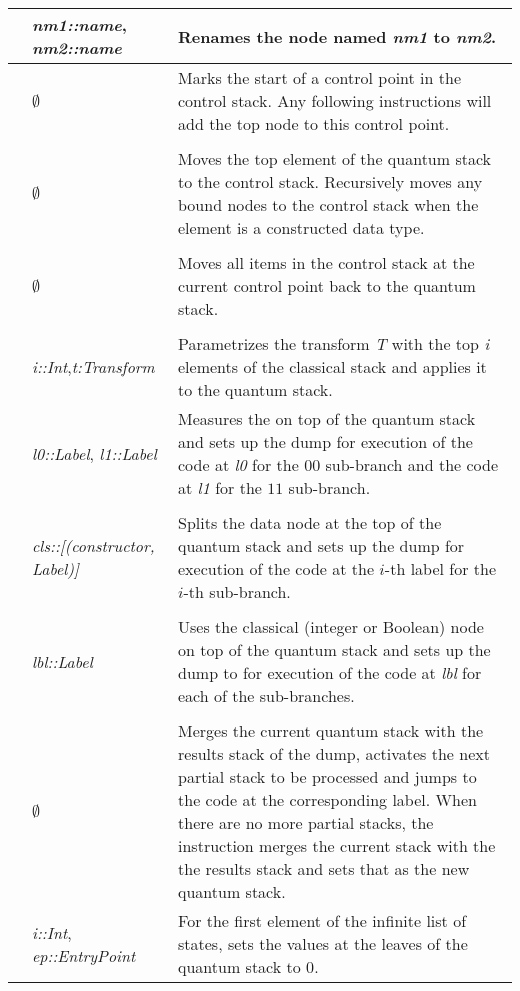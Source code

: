 {\begin{singlespace}
\begin{supertabular}{|p{.85in}|p{1.2in}|p{3.69in}|}
&\emph{nm1::name}, \emph{nm2::name}&Renames 
the node named \emph{nm1} to 
\emph{nm2}.\\
\hline
{}&$\emptyset$&Marks  the start
of a control point in the control stack. Any following  
instructions will add the top node to this control point.\\ & & \\
&$\emptyset$&Moves the top element of the quantum stack
to the control stack. Recursively moves any bound nodes to the control
stack when the element is 
a constructed data type.\\ & & \\
&$\emptyset$&Moves all items in the  control stack at the
current control point back to the quantum stack.\\ & & \\
&\emph{i::Int},\emph{t:Transform}&Parametrizes the transform \emph{T} with
the top \emph{i} elements of the classical stack and applies it to the
 quantum stack.\\
\hline
{}&\emph{l0::Label}, \emph{l1::Label}&Measures 
the \qubit{} on top of the
quantum stack and sets up the dump for execution of
 the code at \emph{l0} for the $00$ sub-branch and 
the code at \emph{l1} for the $11$ sub-branch.\\ & & \\
&\emph{cls::[(constructor, Label)]}&Splits the data node at 
the top of the
quantum stack and sets up the dump  for execution of the code at 
the $i$-th label for the $i$-th  sub-branch.\\ & & \\
&\emph{lbl::Label}&Uses the classical 
(integer or Boolean) node on top of the
quantum stack and sets up the dump to for execution of the code at 
\emph{lbl} for each of the sub-branches.\\ & & \\
&$\emptyset$&Merges the current quantum stack
 with the results stack of the
dump, activates the next partial stack to be processed
 and jumps to the code at the corresponding 
label. When there are no more partial stacks, the instruction 
merges the current
stack with the the results stack and sets that as the new quantum stack.\\
\hline
{}&\emph{i::Int}, \emph{ep::EntryPoint}&For the first element of the 
infinite list of states, sets the values at the leaves of the 
quantum stack to $0$. 

\end{supertabular}
\end{singlespace}}
